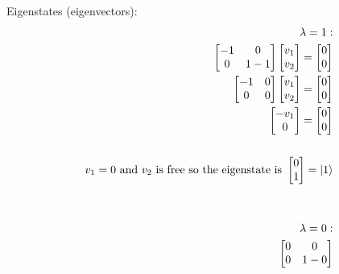 \documentclass{article}
\begin{document}
Eigenstates (eigenvectors):
\begin{align*}
    \begin{split}
        \lambda = 1: \\
        \begin{bmatrix}
            -1 & 0 \\
            0 & 1 - 1
        \end{bmatrix}
        \begin{bmatrix}
            v_1 \\
            v_2
        \end{bmatrix} =
        \begin{bmatrix}
            0 \\
            0
        \end{bmatrix} \\
        \begin{bmatrix}
            -1 & 0 \\
            0 & 0
        \end{bmatrix}
        \begin{bmatrix}
            v_1 \\
            v_2
        \end{bmatrix} =
        \begin{bmatrix}
            0 \\
            0
        \end{bmatrix} \\
        \begin{bmatrix}
            -v_1 \\
            0
        \end{bmatrix}
        = \begin{bmatrix}
            0 \\
            0
        \end{bmatrix} \\\\
        v_1 = 0 \text{ and } v_2 \text{ is free so the eigenstate is } \begin{bmatrix} 0 \\ 1 \end{bmatrix} = \ket{1} \\\\\\
        \lambda = 0: \\
        \begin{bmatrix}
            0 & 0 \\
            0 & 1 - 0
        \end{bmatrix}

\end{split}
\end{align*}
\end{document}
